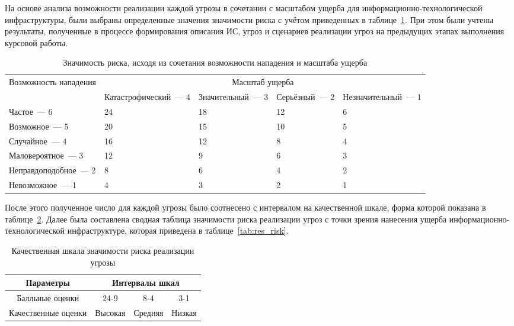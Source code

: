 \point На основе анализа возможности реализации каждой угрозы в
сочетании с масштабом ущерба для информационно-технологической
инфраструктуры, были выбраны определенные значения значимости риска с
учётом приведенных в таблице~\ref{tab:risk}. При этом были учтены
результаты, полученные в процессе формирования описания ИС, угроз и
сценариев реализации угроз на предыдущих этапах выполнения курсовой
работы.

\begin{table}[h]
\caption{Значимость риска, исходя из сочетания возможности нападения и масштаба ущерба}
\label{tab:risk}
\small
\begin{tabular}{|p{4cm}|p{2.5cm}|p{2.5cm}|p{2.5cm}|p{2.5cm}|}
\hline
\multirow{2}{4cm}{Возможность нападения} & \multicolumn{4}{c|}{Масштаб
ущерба}\\\cline{2-5}
& Катастрофиче\-ский~--- 4 & Значитель\-ный~--- 3 & Серьёзный~--- 2 &
Незначитель\-ный~--- 1 \\\hline
Частое~--- 6 & 24 & 18 & 12 & 6 \\\hline
Возможное~--- 5 & 20 & 15 & 10 & 5 \\\hline
Случайное~--- 4 & 16 & 12 & 8 & 4 \\\hline
Маловероятное~--- 3 & 12 & 9 & 6 & 3 \\\hline
Неправдоподобное~--- 2 & 8 & 6 & 4 & 2 \\\hline
Невозможное~--- 1 & 4 & 3 & 2 & 1 \\\hline
\end{tabular}
\end{table}
\normalsize

\point После этого полученное число для каждой угрозы было соотнесено
с интервалом на качественной шкале, форма которой показана в
таблице~\ref{tab:risk_scal}. Далее была составлена сводная таблица
значимости риска реализации угроз с точки зрения нанесения ущерба
информационно-технологической инфраструктуре, которая приведена в
таблице~\ref{tab:res_risk}.

\begin{table}[h]
  \caption{Качественная шкала значимости риска реализации угрозы}
  \label{tab:risk_scal}
\small
  \begin{tabular}{|c|c|c|c|}
    \hline
    Параметры & \multicolumn{3}{c|}{Интервалы шкал}\\\hline
    Балльные оценки &  24-9 & 8-4 & 3-1 \\\hline
    Качественные оценки & Высокая & Средняя & Низкая \\\hline
  \end{tabular}
\end{table}
\normalsize

